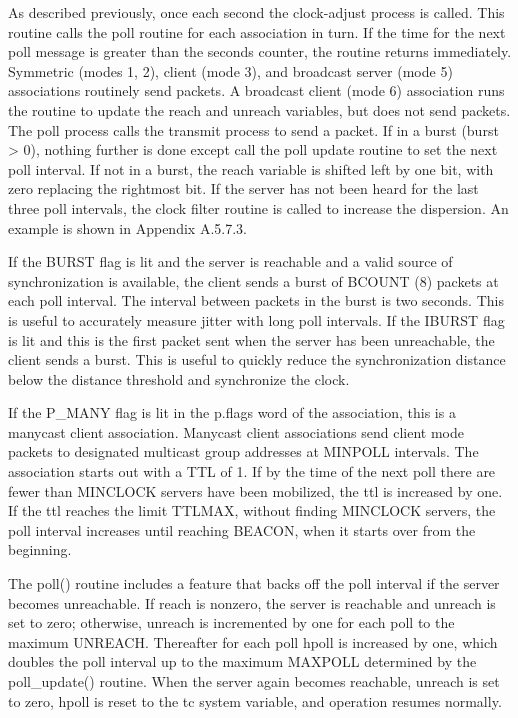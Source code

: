    As described previously, once each second the clock-adjust process is
   called.  This routine calls the poll routine for each association in
   turn.  If the time for the next poll message is greater than the
   seconds counter, the routine returns immediately.  Symmetric (modes
   1, 2), client (mode 3), and broadcast server (mode 5) associations
   routinely send packets.  A broadcast client (mode 6) association runs
   the routine to update the reach and unreach variables, but does not
   send packets.  The poll process calls the transmit process to send a
   packet.  If in a burst (burst > 0), nothing further is done except
   call the poll update routine to set the next poll interval.
      If not in a burst, the reach variable is shifted left by one bit,
   with zero replacing the rightmost bit.  If the server has not been
   heard for the last three poll intervals, the clock filter routine is
   called to increase the dispersion.  An example is shown in
   Appendix A.5.7.3.

   If the BURST flag is lit and the server is reachable and a valid
   source of synchronization is available, the client sends a burst of
   BCOUNT (8) packets at each poll interval.  The interval between
   packets in the burst is two seconds.  This is useful to accurately
   measure jitter with long poll intervals.  If the IBURST flag is lit
   and this is the first packet sent when the server has been
   unreachable, the client sends a burst.  This is useful to quickly
   reduce the synchronization distance below the distance threshold and
   synchronize the clock.

   If the P_MANY flag is lit in the p.flags word of the association,
   this is a manycast client association.  Manycast client associations
   send client mode packets to designated multicast group addresses at
   MINPOLL intervals.  The association starts out with a TTL of 1.  If
   by the time of the next poll there are fewer than MINCLOCK servers
   have been mobilized, the ttl is increased by one.  If the ttl reaches
   the limit TTLMAX, without finding MINCLOCK servers, the poll interval
   increases until reaching BEACON, when it starts over from the
   beginning.

   The poll() routine includes a feature that backs off the poll
   interval if the server becomes unreachable.  If reach is nonzero, the
   server is reachable and unreach is set to zero; otherwise, unreach is
   incremented by one for each poll to the maximum UNREACH.  Thereafter
   for each poll hpoll is increased by one, which doubles the poll
   interval up to the maximum MAXPOLL determined by the poll_update()
   routine.  When the server again becomes reachable, unreach is set to
   zero, hpoll is reset to the tc system variable, and operation resumes
   normally.

